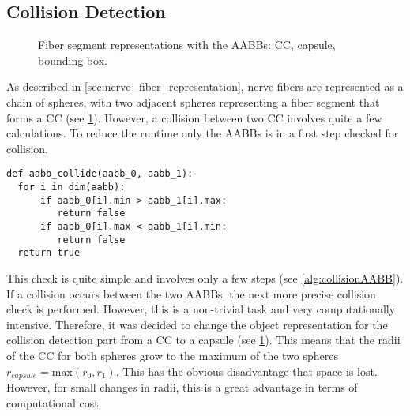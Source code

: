\subsection{Collision Detection}
\label{sec:collisionDetection}
%
\begin{figure}[!t]
    \centering
    \setlength{\tikzwidth}{0.6\textwidth}
    \tikzset{external/export=false}
	\caption[]{Fiber segment representations with the \acp{AABB}: \raisebox{.25em}{\tikz \draw[black](0,0)--(0.275,0);} \ac{CC}, \raisebox{.25em}{\tikz \draw[blue, dash pattern=on 2.5pt off 2.5pt](0,0)--(0.275,0);} capsule, \raisebox{.25em}{\tikz \draw[red, dash pattern={on 2.5pt off 0.9pt on 0.42pt off 0.9pt}](0,0)--(0.275,0);} bounding box.}
	\label{fig:conical_capsule}
\end{figure}
% 
As described in \cref{sec:nerve_fiber_representation}, nerve fibers are represented as a chain of spheres, with two adjacent spheres representing a fiber segment that forms a \ac{CC} (see \cref{fig:conical_capsule}).
However, a collision between two \ac{CC} involves quite a few calculations. To reduce the runtime only the \acp{AABB} is in a first step checked for collision.
%
\begin{lstfloat}[!tb]
\lstset{style=python}
\begin{lstlisting}[]
def aabb_collide(aabb_0, aabb_1):
  for i in dim(aabb):
      if aabb_0[i].min > aabb_1[i].max:
         return false
      if aabb_0[i].max < aabb_1[i].min:
         return false
  return true
\end{lstlisting}
\caption{Calculation if a collision between \acp{AABB} exists.}
\label{alg:collisionAABB}
\end{lstfloat}
%
This check is quite simple and involves only a few steps (see \cref{alg:collisionAABB}).
If a collision occurs between the two \acp{AABB}, the next more precise collision check is performed.
However, this is a non-trivial task and very computationally intensive.
Therefore, it was decided to change the object representation for the collision detection part from a \ac{CC} to a capsule (see \cref{fig:conical_capsule}).
This means that the radii of the \ac{CC} for both spheres grow to the maximum of the two spheres $r_{\mathit{capsule}} = \mathrm{max}(r_0, r_1)$.
This has the obvious disadvantage that space is lost. However, for small changes in radii, this is a great advantage in terms of computational cost.
\par
% 
